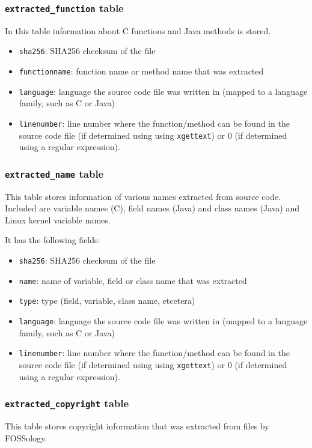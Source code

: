 \documentclass[10pt]{article}
\begin{document}
\subsubsection{\texttt{extracted\_function} table}

In this table information about C functions and Java methods is stored.

\begin{itemize}
\item \texttt{sha256}: SHA256 checksum of the file
\item \texttt{functionname}: function name or method name that was extracted
\item \texttt{language}: language the source code file was written in (mapped
to a language family, such as C or Java)
\item \texttt{linenumber}: line number where the function/method can be found
in the source code file (if determined using using \texttt{xgettext}) or $0$
(if determined using a regular expression).
\end{itemize}

\subsubsection{\texttt{extracted\_name} table}
This table stores information of various names extracted from source code.
Included are variable names (C), field names (Java) and class names (Java) and
Linux kernel variable names.

It has the following fields:

\begin{itemize}
\item \texttt{sha256}: SHA256 checksum of the file
\item \texttt{name}: name of variable, field or class name that was extracted
\item \texttt{type}: type (field, variable, class name, etcetera)
\item \texttt{language}: language the source code file was written in (mapped
to a language family, such as C or Java)
\item \texttt{linenumber}: line number where the function/method can be found
in the source code file (if determined using using \texttt{xgettext}) or $0$
(if determined using a regular expression).
\end{itemize}

\subsubsection{\texttt{extracted\_copyright} table}
This table stores copyright information that was extracted from files by
FOSSology.
\end{document}
